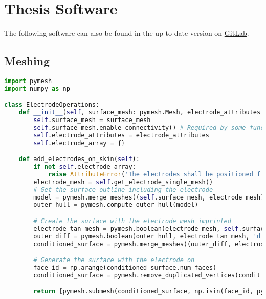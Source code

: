 \pagebreak
\chapter{Thesis Software}
\label{appndx:code}

The following software can also be found in the up-to-date version on \href{https://gitlab.com/ttis-simulations/ttis-software/-/tree/master/Scripts}{GitLab}.

\section{Meshing}
\begin{lstlisting}[language=Python,caption={Class handling electrode operations on the models},captionpos=b,label=lst:electrode_operations_class]
import pymesh
import numpy as np

class ElectrodeOperations:
    def __init__(self, surface_mesh: pymesh.Mesh, electrode_attributes: dict):
        self.surface_mesh = surface_mesh
        self.surface_mesh.enable_connectivity() # Required by some functions below
        self.electrode_attributes = electrode_attributes
        self.electrode_array = {}

    def add_electrodes_on_skin(self):
        if not self.electrode_array:
            raise AttributeError('The electrodes shall be positioned first before added on the surface. Please call the positioning function first.')
        electrode_mesh = self.get_electrode_single_mesh()
        # Get the surface outline including the electrode
        model = pymesh.merge_meshes((self.surface_mesh, electrode_mesh))
        outer_hull = pymesh.compute_outer_hull(model)

        # Create the surface with the electrode mesh imprinted
        electrode_tan_mesh = pymesh.boolean(electrode_mesh, self.surface_mesh, 'difference')
        outer_diff = pymesh.boolean(outer_hull, electrode_tan_mesh, 'difference')
        conditioned_surface = pymesh.merge_meshes((outer_diff, electrode_tan_mesh))

        # Generate the surface with the electrode on
        face_id = np.arange(conditioned_surface.num_faces)
        conditioned_surface = pymesh.remove_duplicated_vertices(conditioned_surface)[0] # Remove any duplicate vertices

        return [pymesh.submesh(conditioned_surface, np.isin(face_id, pymesh.detect_self_intersection(conditioned_surface)[:, 0], invert=True), 0), outer_diff]  # Get rid of the duplicate faces on the tangent surface, without merging the points


\end{lstlisting}
